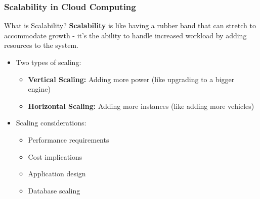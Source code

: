 \documentclass{beamer}
\begin{document}
\begin{frame}
    \frametitle{Scalability in Cloud Computing}
    
    \begin{alertblock}{What is Scalability?}
        \textbf{Scalability} is like having a rubber band that can stretch to accommodate growth - it's the ability to handle increased workload by adding resources to the system.
    \end{alertblock}
    
    \begin{itemize}
        \item Two types of scaling:
        \begin{itemize}
            \item \textbf{Vertical Scaling:} Adding more power (like upgrading to a bigger engine)
            \item \textbf{Horizontal Scaling:} Adding more instances (like adding more vehicles)
        \end{itemize}
        
        \item Scaling considerations:
        \begin{itemize}
            \item Performance requirements
            \item Cost implications
            \item Application design
            \item Database scaling
        \end{itemize}
    \end{itemize}
\end{frame}
\end{document}
